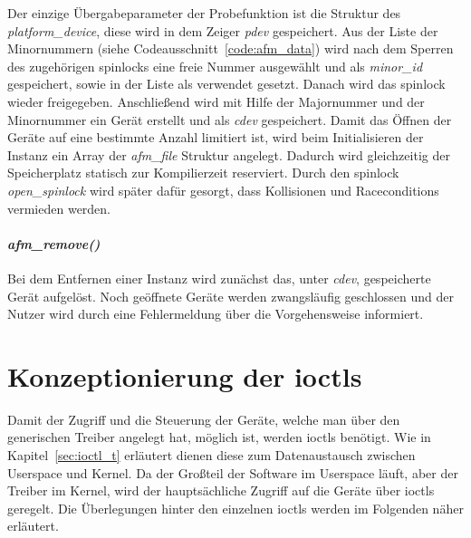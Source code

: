Der einzige Übergabeparameter der Probefunktion ist die Struktur des \textit{platform\_device}, diese wird in dem Zeiger \textit{pdev} gespeichert. 
Aus der Liste der Minornummern (siehe Codeausschnitt~\ref{code:afm_data}) wird nach dem Sperren des zugehörigen \glspl{spinlock} eine freie Nummer ausgewählt und als \textit{minor\_id} gespeichert, sowie in der Liste als verwendet gesetzt. Danach wird das \gls{spinlock} wieder freigegeben.
Anschließend wird mit Hilfe der Majornummer und der Minornummer ein Gerät erstellt und als \textit{cdev} gespeichert. 
Damit das Öffnen der Geräte auf eine bestimmte Anzahl limitiert ist, wird beim Initialisieren der Instanz ein Array der \textit{afm\_file} Struktur angelegt. Dadurch wird gleichzeitig der Speicherplatz statisch zur Kompilierzeit reserviert. Durch den \gls{spinlock} \textit{open\_spinlock} wird später dafür gesorgt, dass Kollisionen und Raceconditions vermieden werden.

\paragraph*{\textit{afm\_remove()}}
Bei dem Entfernen einer Instanz wird zunächst das, unter \textit{cdev}, gespeicherte Gerät aufgelöst. Noch geöffnete Geräte werden zwangsläufig geschlossen und der Nutzer wird durch eine Fehlermeldung über die Vorgehensweise informiert.


\section{Konzeptionierung der \acl{ioctl}s}\label{sec:ioctl}
Damit der Zugriff und die Steuerung der Geräte, welche man über den generischen Treiber angelegt hat, möglich ist, werden \ac{ioctl}s benötigt. 
Wie in Kapitel~\ref{sec:ioctl_t} erläutert dienen diese zum Datenaustausch zwischen Userspace und Kernel. Da der Großteil der Software im Userspace läuft, aber der Treiber im Kernel, wird der hauptsächliche Zugriff auf die Geräte über \ac{ioctl}s geregelt. Die Überlegungen hinter den einzelnen \ac{ioctl}s werden im Folgenden näher erläutert.\\


